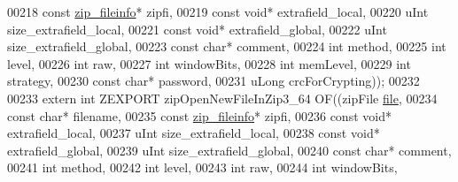 \begin{DoxyCode}
00218                                             \textcolor{keyword}{const} \hyperlink{structzip__fileinfo}{zip\_fileinfo}* zipfi,
00219                                             \textcolor{keyword}{const} \textcolor{keywordtype}{void}* extrafield\_local,
00220                                             uInt size\_extrafield\_local,
00221                                             \textcolor{keyword}{const} \textcolor{keywordtype}{void}* extrafield\_global,
00222                                             uInt size\_extrafield\_global,
00223                                             \textcolor{keyword}{const} \textcolor{keywordtype}{char}* comment,
00224                                             \textcolor{keywordtype}{int} method,
00225                                             \textcolor{keywordtype}{int} level,
00226                                             \textcolor{keywordtype}{int} raw,
00227                                             \textcolor{keywordtype}{int} windowBits,
00228                                             \textcolor{keywordtype}{int} memLevel,
00229                                             \textcolor{keywordtype}{int} strategy,
00230                                             \textcolor{keyword}{const} \textcolor{keywordtype}{char}* password,
00231                                             uLong crcForCrypting));
00232 
00233 \textcolor{keyword}{extern} \textcolor{keywordtype}{int} ZEXPORT zipOpenNewFileInZip3\_64 OF((zipFile \hyperlink{structfile}{file},
00234                                             \textcolor{keyword}{const} \textcolor{keywordtype}{char}* filename,
00235                                             \textcolor{keyword}{const} \hyperlink{structzip__fileinfo}{zip\_fileinfo}* zipfi,
00236                                             \textcolor{keyword}{const} \textcolor{keywordtype}{void}* extrafield\_local,
00237                                             uInt size\_extrafield\_local,
00238                                             \textcolor{keyword}{const} \textcolor{keywordtype}{void}* extrafield\_global,
00239                                             uInt size\_extrafield\_global,
00240                                             \textcolor{keyword}{const} \textcolor{keywordtype}{char}* comment,
00241                                             \textcolor{keywordtype}{int} method,
00242                                             \textcolor{keywordtype}{int} level,
00243                                             \textcolor{keywordtype}{int} raw,
00244                                             \textcolor{keywordtype}{int} windowBits,

\end{DoxyCode}
